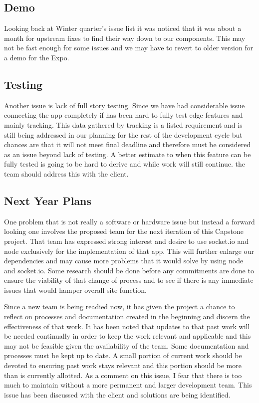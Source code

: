 \documentclass[onecolumn, draftclsnofoot,10pt, compsoc]{IEEEtran}
\begin{document}
\subsection{Demo}
Looking back at Winter quarter's issue list it was noticed that it was about a month for upstream fixes to find their way down to our components. This may not be fast enough for some issues and we may have to revert to older version for a demo for the Expo. 

\subsection{Testing}
Another issue is lack of full story testing. Since we have had considerable issue connecting the app completely if has been hard to fully test edge features and mainly tracking. This data gathered by tracking is a listed requirement and is still being addressed in our planning for the rest of the development cycle but chances are that it will not meet final deadline and therefore must be considered as an issue beyond lack of testing. A better estimate to when this feature can be fully tested is going to be hard to derive and while work will still continue. the team should address this with the client. 

\subsection{Next Year Plans} 
One problem that is not really a software or hardware issue but instead a forward looking one involves the proposed team for the next iteration of this Capstone project. That team has expressed strong interest and desire to use socket.io and node exclusively for the implementation of that app. This will further enlarge our dependencies and may cause more problems that it would solve by using node and socket.io. Some research should be done before any commitments are done to ensure the viability of that change of process and to see if there is any immediate issues that would hamper overall site function. 

Since a new team is being readied now, it has given the project a chance to reflect on processes and documentation created in the beginning and discern the effectiveness of that work. It has been noted that updates to that past work will be needed continually in order to keep the work relevant and applicable and this may not be feasible given the availability of the team. Some documentation and processes must be kept up to date. A small portion of current work should be devoted to ensuring past work stays relevant and this portion should be more than is currently allotted. As a comment on this issue, I fear that there is too much to maintain without a more permanent and larger development team. This issue has been discussed with the client and solutions are being identified. 
\end{document}
